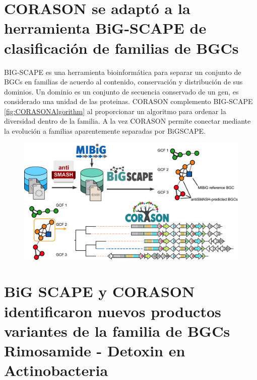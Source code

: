 \documentclass[12pt,twoside]{reedthesis}
\begin{document}
  \section{CORASON se adaptó a la herramienta BiG-SCAPE de clasificación
  de familias de
  BGCs}\label{corason-se-adapto-a-la-herramienta-big-scape-de-clasificacion-de-familias-de-bgcs}
  
  BIG-SCAPE es una herramienta bioinformática para separar un conjunto de
  BGCs en familias de acuerdo al contenido, conservación y distribución de
  sus dominios. Un dominio es un conjunto de secuencia conservado de un
  gen, es considerado una unidad de las proteinas. CORASON complemento
  BIG-SCAPE \autoref{fig:CORASONAlgorithm} al proporcionar un algoritmo
  para ordenar la diversidad dentro de la familia. A la vez CORASON
  permite conectar mediante la evolución a familias aparentemente
  separadas por BiGSCAPE.
  
  \begin{figure}[h!tbp]
  \centering
  \includegraphics[angle = 0,scale = .3]{chapter3/corason_fig1.png}
  \caption[Algoritmo de CORASON Algorithm]{\footnotesize{}}
  \label{fig:CORASONAlgorithm}
  \end{figure}
  
  \section{BiG SCAPE y CORASON identificaron nuevos productos variantes de
  la familia de BGCs Rimosamide - Detoxin en
  Actinobacteria}\label{big-scape-y-corason-identificaron-nuevos-productos-variantes-de-la-familia-de-bgcs-rimosamide---detoxin-en-actinobacteria}
  
\end{document}
